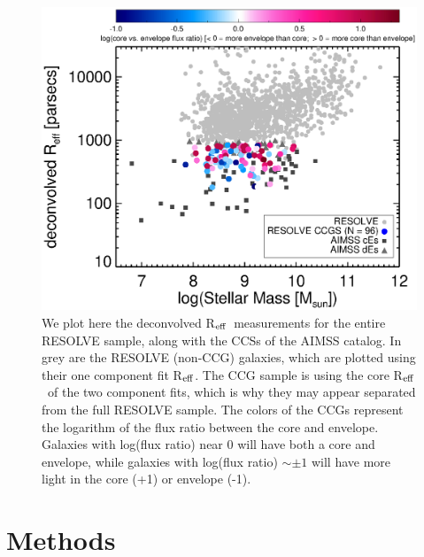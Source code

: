 \documentclass[iop,apj]{emulateapj}
\newcommand{\Reff}{R$_{\rm eff}$}
\begin{document}
\begin{figure}[b]
\begin{center}
\includegraphics{Reff_Mstars.eps}
\caption{We plot here the deconvolved \Reff\ measurements for the entire RESOLVE sample, along with the CCSs of the AIMSS catalog. In grey are the RESOLVE (non-CCG) galaxies, which are plotted using their one component fit \Reff. The CCG sample is using the core \Reff\ of the two component fits, which is why they may appear separated from the full RESOLVE sample. The colors of the CCGs represent the logarithm of the flux ratio between the core and envelope. Galaxies with log(flux ratio) near 0 will have both a core and envelope, while galaxies with log(flux ratio) $\sim \pm 1$ will have more light in the core (+1) or envelope (-1).}
\label{fig:radius}
\end{center}
\end{figure}

\section{Methods}
\label{methods}
\end{document}

